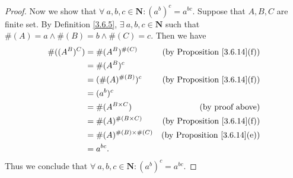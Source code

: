 \begin{proof}
    Now we show that \(\forall\ a, b, c \in \mathbf{N} : (a^b)^c = a^{bc}\).
    Suppose that \(A, B, C\) are finite set.
    By Definition \ref{3.6.5}, \(\exists\ a, b, c \in \mathbf{N}\) such that \(\#(A) = a \land \#(B) = b \land \#(C) = c\).
    Then we have
    \begin{align*}
        \#((A^B)^C) & = \#(A^B)^{\#(C)}            & \text{(by Proposition \ref{3.6.14}(f))} \\
                    & = \#(A^B)^c                                                            \\
                    & = (\#(A)^{\#(B)})^c          & \text{(by Proposition \ref{3.6.14}(f))} \\
                    & = (a^b)^c                                                              \\
                    & = \#(A^{B \times C})         & \text{(by proof above)}                 \\
                    & = \#(A)^{\#(B \times C)}     & \text{(by Proposition \ref{3.6.14}(f))} \\
                    & = \#(A)^{\#(B) \times \#(C)} & \text{(by Proposition \ref{3.6.14}(e))} \\
                    & = a^{bc}.
    \end{align*}
    Thus we conclude that \(\forall\ a, b, c \in \mathbf{N} : (a^b)^c = a^{bc}\).


\end{proof}
